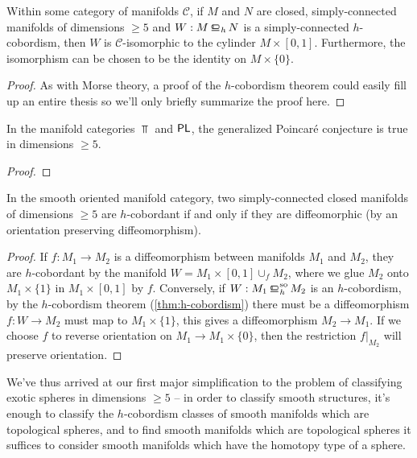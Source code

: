 \begin{theorem}[$h$-cobordism]\label{thm:h-cobordism}
	Within some category of manifolds $\mathscr{C}$, if $M$ and $N$ are closed, simply-connected manifolds of dimensions $\geq 5$ and $W : M \hbord N$ is a simply-connected $h$-cobordism, then $W$ is $\mathscr{C}$-isomorphic to the cylinder $M\times [0,1]$. Furthermore, the isomorphism can be chosen to be the identity on $M\times \{0\}$.
\end{theorem}
\begin{proof}
	As with Morse theory, a proof of the $h$-cobordism theorem could easily fill up an entire thesis so we'll only briefly summarize the proof here.

\end{proof}

\begin{theorem}
	In the manifold categories $\Top$ and $\mathsf{PL}$, the generalized Poincar\'e conjecture is true in dimensions $\geq 5$.
\end{theorem}
\begin{proof}
\end{proof}


\begin{corollary}\label{thm:h-cobordism-diffeomorphism}
	In the smooth oriented manifold category, two simply-connected closed manifolds of dimensions $\geq 5$ are $h$-cobordant if and only if they are diffeomorphic (by an orientation preserving diffeomorphism).
\end{corollary}
\begin{proof}
	If $f : M_1 \to M_2$ is a diffeomorphism between manifolds $M_1$ and $M_2$, they are $h$-cobordant by the manifold $W=M_1\times [0,1]\cup_f M_2$, where we glue $M_2$ onto $M_1\times \{1\}$ in $M_1\times [0,1]$ by $f$.
	Conversely, if $W : M_1\sohbord M_2$ is an $h$-cobordism, by the $h$-cobordism theorem (\ref{thm:h-cobordism}) there must be a diffeomorphism $f : W \to M_2$ must map to $M_1\times \{1\}$, this gives a diffeomorphism $M_2 \to M_1$. If we choose $f$ to reverse orientation on $M_1\to M_1\times \{0\}$, then the restriction $f|_{M_2}$ will preserve orientation.
\end{proof}

We've thus arrived at our first major simplification to the problem of classifying exotic spheres in dimensions $\geq 5$ -- in order to classify smooth structures, it's enough to classify the $h$-cobordism classes of smooth manifolds which are topological spheres, and to find smooth manifolds which are topological spheres it suffices to consider smooth manifolds which have the homotopy type of a sphere.

